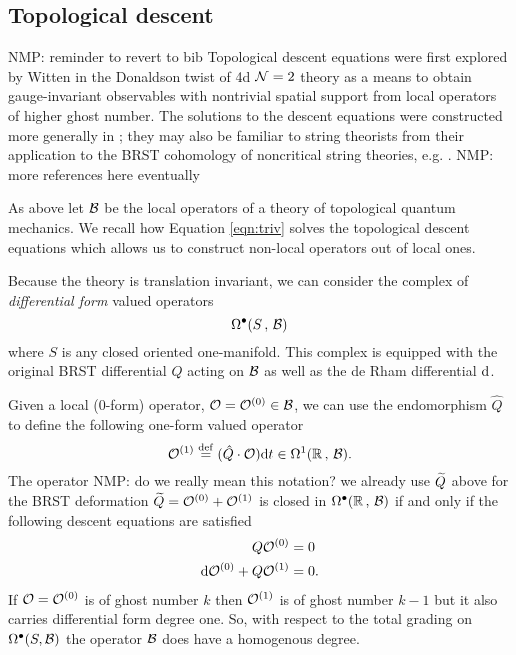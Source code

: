 \documentclass[11pt]{amsart}
\def\natalie#1{{\textcolor{green!65!black}{NMP: {#1}}}}
\begin{document}


\subsection{Topological descent} 
\natalie{reminder to revert to bib}
Topological descent equations were first explored by Witten in the Donaldson twist of 4d $\mathcal N=2$ theory \cite{W88} as a means to obtain gauge-invariant observables with nontrivial spatial support from local operators of higher ghost number. The solutions to the descent equations were constructed more generally in \cite{MW97}; they may also be familiar to string theorists from their application to the BRST cohomology of noncritical string theories, e.g. \cite{WZ92}. \natalie{more references here eventually}

As above let $\mathcal B$ be the local operators of a theory of topological quantum mechanics. 
We recall how Equation \eqref{eqn:triv} solves the topological descent equations which allows us to construct non-local operators out of local ones. 

Because the theory is translation invariant, we can consider the complex of {\em differential form} valued operators
\[
\Omega^\bullet(S \, , \, \mathcal B) 
\]
where $S$ is any closed oriented one-manifold. 
This complex is equipped with the original BRST differential $Q$ acting on $\mathcal B$ as well as the de Rham differential ${\rm d}$. 

Given a local (0-form) operator, $\mathcal O = \mathcal O^{(0)} \in \mathcal B$, we can use the endomorphism $\hat{Q}$ to define the following one-form valued operator
\[
\mathcal O^{(1)} \overset{\rm def}{=} (\hat{Q} \cdot \mathcal O) {\rm d} t \in \Omega^1(\mathbb R \, , \, \mathcal B).
\]
The operator \natalie{do we really mean this notation? we already use $\widetilde{Q}$ above for the BRST deformation} $\widetilde{Q} = \mathcal O^{(0)} + \mathcal O^{(1)}$ is closed in $\Omega^\bullet(\mathbb R \, , \, \mathcal B)$ if and only if the following descent equations are satisfied 
\begin{align*}
Q \mathcal O^{(0)} & = 0 \\
{\rm d} \mathcal O^{(0)} + Q \mathcal O^{(1)} & = 0 .
\end{align*}
If $\mathcal O = \mathcal O^{(0)}$ is of ghost number $k$ then $\mathcal O^{(1)}$ is of ghost number $k-1$ but it also carries differential form degree one. 
So, with respect to the total grading on $\Omega^\bullet(S, \mathcal B)$ the operator $\mathcal B$ does have a homogenous degree.
\end{document}
